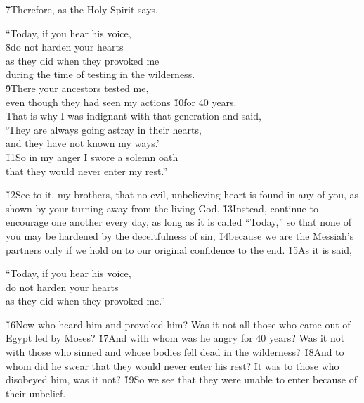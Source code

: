 \v{7}Therefore, as the Holy Spirit says,

\begin{poetry}
\poeml ``Today, if you hear his voice, \\
\poeml \v{8}do not harden your hearts \\
\poeml as they did when they provoked me \\
\poemll    during the time of testing in the wilderness. \\
\poeml \v{9}There your ancestors tested me, \\
\poemll    even though they had seen my actions \v{10}for 40 years. \\
\poeml That is why I was indignant with that generation and said, \\
\poemll    `They are always going astray in their hearts, \\
\poemlll       and they have not known my ways.' \\
\poeml \v{11}So in my anger I swore a solemn oath \\
\poemll    that they would never enter my rest.''
\end{poetry}

\v{12}See to it, my brothers, that no evil, unbelieving heart is found in any of you, as shown by your turning away from the living God. \v{13}Instead, continue to encourage one another every day, as long as it is called ``Today,'' so that none of you may be hardened by the deceitfulness of sin, \v{14}because we are the Messiah's partners only if we hold on to our original confidence to the end. \v{15}As it is said,

\begin{poetry}
\poeml ``Today, if you hear his voice, \\
\poemll    do not harden your hearts \\
\poemlll       as they did when they provoked me.''
\end{poetry}

\v{16}Now who heard him and provoked him? Was it not all those who came out of Egypt led by Moses? \v{17}And with whom was he angry for 40 years? Was it not with those who sinned and whose bodies fell dead in the wilderness? \v{18}And to whom did he swear that they would never enter his rest? It was to those who disobeyed him, was it not? \v{19}So we see that they were unable to enter because of their unbelief.

